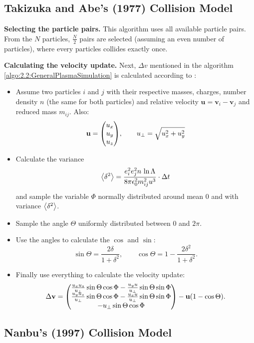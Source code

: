 \subsection{Takizuka and Abe's (1977) Collision Model}\label{sec:TA_updateEQ}

\textbf{Selecting the particle pairs.} This algorithm uses all available particle pairs. From the $N$ particles, $\frac{N}{2}$ pairs are selected (assuming an even number of particles), where every particles collides exactly once. 

\textbf{Calculating the velocity update.} Next, $\Delta v$ mentioned in the algorithm \ref{algo:2.2:GeneralPlasmaSimulation} is calculated according to \cite[4310]{Wang2008}:
\begin{itemize}
    \item Assume two particles $i$ and $j$ with their respective masses, charges, number density $n$ (the same for both particles) and relative velocity $\mathbf{u} = \mathbf{v}_i - \mathbf{v}_j$ and reduced mass $m_{ij}$. Also:
    $$
    \mathbf{u} = \mqty(u_x\\u_y\\u_z) ,
    \qquad u_\perp = \sqrt{u_x^2 + u_y^2}
    $$
    \item Calculate the variance
    $$
    \expval{\delta^2} = \frac{e_i^2e_j^2n \,\ln\Lambda}{8\pi\epsilon_0^2m_{ij}^2u^3} \cdot \Delta t
    $$
    and sample the variable $\Phi$ normally distributed around mean 0 and with variance $\expval{\delta^2}$. 
    \item Sample the angle $\Theta$ uniformly distributed between $0$ and $2\pi$.
    \item Use the angles to calculate the $\cos$ and $\sin$:
    $$
    \sin\Theta = \frac{2 \delta}{1 + \delta^2}, \qquad \cos\Theta = 1 - \frac{2 \delta^2}{1 + \delta^2}. 
    $$
    \item Finally use everything to calculate the velocity update:
    $$
    \Delta \mathbf{v} = \mqty(\frac{u_xu_z}{u_\perp}\sin\Theta\cos\Phi - \frac{u_yu}{u_\perp} \sin\Theta\sin\Phi \\
                              \frac{u_yu_z}{u_\perp}\sin\Theta\cos\Phi - \frac{u_xu}{u_\perp} \sin\Theta\sin\Phi \\
                              -u_\perp\sin\Theta\cos\Phi) 
                        - \mathbf{u} \qty(1 - \cos\Theta) .
    $$
\end{itemize}


\subsection{Nanbu's (1997) Collision Model}\label{sec:Nanbu_updateEQ}

